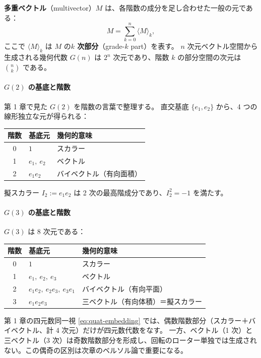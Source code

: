 \documentclass[dvipdfmx,a4paper,oneside]{jsbook}
\numberwithin{equation}{chapter}
\begin{document}
\textbf{多重ベクトル}（multivector）\(M\) は、各階数の成分を足し合わせた一般の元である：
\begin{equation}
  M = \sum_{k=0}^{n} \langle M \rangle_k,
  \label{eq:mv-decomp}
\end{equation}
ここで \(\langle M \rangle_k\) は \(M\) の\textbf{\(k\) 次部分}（grade-\(k\) part）を表す。
\(n\) 次元ベクトル空間から生成される幾何代数 \(G(n)\) は \(2^n\) 次元であり、階数 \(k\) の部分空間の次元は \(\binom{n}{k}\) である。

\paragraph{\(G(2)\) の基底と階数}
第 1 章で見た \(G(2)\) を階数の言葉で整理する。
直交基底 \(\{e_1,e_2\}\) から、4 つの線形独立な元が得られる：
\begin{center}
\begin{tabular}{@{}cll@{}}
  \toprule
  階数 & 基底元 & 幾何的意味 \\
  \midrule
  0 & \(1\) & スカラー \\
  1 & \(e_1,\ e_2\) & ベクトル \\
  2 & \(e_1 e_2\) & バイベクトル（有向面積） \\
  \bottomrule
\end{tabular}
\end{center}
擬スカラー \(I_2 := e_1 e_2\) は 2 次の最高階成分であり、\(I_2^2 = -1\) を満たす。

\paragraph{\(G(3)\) の基底と階数}
\(G(3)\) は 8 次元である：
\begin{center}
\begin{tabular}{@{}cll@{}}
  \toprule
  階数 & 基底元 & 幾何的意味 \\
  \midrule
  0 & \(1\) & スカラー \\
  1 & \(e_1,\ e_2,\ e_3\) & ベクトル \\
  2 & \(e_1 e_2,\ e_2 e_3,\ e_3 e_1\) & バイベクトル（有向平面） \\
  3 & \(e_1 e_2 e_3\) & 三ベクトル（有向体積）＝擬スカラー \\
  \bottomrule
\end{tabular}
\end{center}
第 1 章の四元数同一視 \eqref{eq:quat-embedding} では、偶数階数部分（スカラー＋バイベクトル、計 4 次元）だけが四元数代数をなす。
一方、ベクトル（1 次）と三ベクトル（3 次）は奇数階数部分を形成し、回転のローター単独では生成されない。この偶奇の区別は次章のベルソル論で重要になる。
\end{document}
